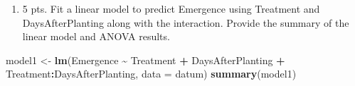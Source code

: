 \documentclass[
]{article}
\newenvironment{Shaded}{\begin{snugshade}}{\end{snugshade}}
\newcommand{\AttributeTok}[1]{\textcolor[rgb]{0.13,0.29,0.53}{#1}}
\newcommand{\FunctionTok}[1]{\textcolor[rgb]{0.13,0.29,0.53}{\textbf{#1}}}
\newcommand{\NormalTok}[1]{#1}
\newcommand{\OtherTok}[1]{\textcolor[rgb]{0.56,0.35,0.01}{#1}}
\newcommand{\SpecialCharTok}[1]{\textcolor[rgb]{0.81,0.36,0.00}{\textbf{#1}}}
\providecommand{\tightlist}{%
  \setlength{\itemsep}{0pt}\setlength{\parskip}{0pt}}
\begin{document}
\begin{enumerate}
\def\labelenumi{\arabic{enumi}.}
\setcounter{enumi}{1}
\tightlist
\item
  5 pts. Fit a linear model to predict Emergence using Treatment and
  DaysAfterPlanting along with the interaction. Provide the summary of
  the linear model and ANOVA results.
\end{enumerate}

\begin{Shaded}
\begin{Highlighting}[]
\NormalTok{model1 }\OtherTok{\textless{}{-}} \FunctionTok{lm}\NormalTok{(Emergence }\SpecialCharTok{\textasciitilde{}}\NormalTok{ Treatment }\SpecialCharTok{+}\NormalTok{ DaysAfterPlanting }\SpecialCharTok{+}\NormalTok{ Treatment}\SpecialCharTok{:}\NormalTok{DaysAfterPlanting, }\AttributeTok{data =}\NormalTok{ datum)}
\FunctionTok{summary}\NormalTok{(model1)}
\end{Highlighting}
\end{Shaded}
\end{document}
